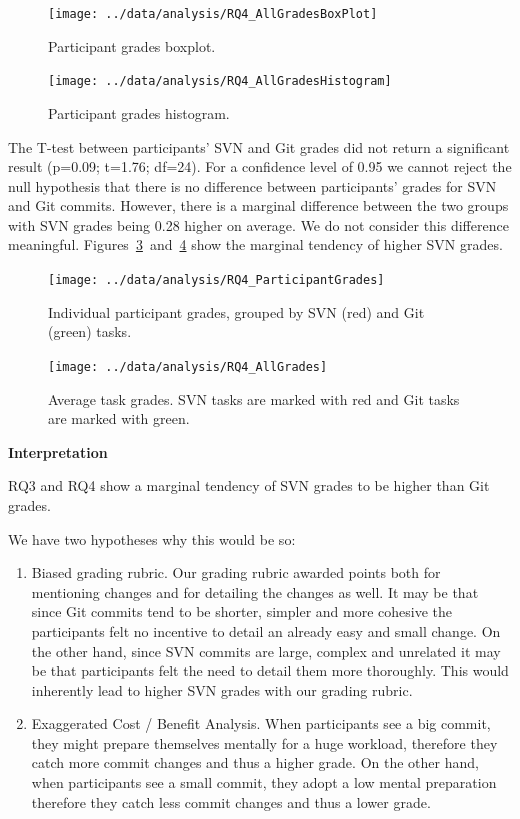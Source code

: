\documentclass[letterpaper]{article}
\begin{document}
\begin{figure}[H]
    \centering
    \texttt{[image: ../data/analysis/RQ4\_AllGradesBoxPlot]}
    \caption{Participant grades boxplot.}
    \label{fig:rq4-allParticipantsBox}
\end{figure}

\begin{figure}[H]
    \centering
    \texttt{[image: ../data/analysis/RQ4\_AllGradesHistogram]}
    \caption{Participant grades histogram.}
    \label{fig:rq4-allParticipantsHist}
\end{figure}

The T-test between participants' SVN and Git grades did not return a significant result (p=0.09; t=1.76; df=24). 
For a confidence level of 0.95 we cannot reject the null hypothesis that there is no difference between participants' grades for SVN and Git commits.
However, there is a marginal difference between the two groups with SVN grades being 0.28 higher on average.
We do not consider this difference meaningful.
Figures~\ref{fig:rq4-participantGrades}~and~\ref{fig:rq4-taskGrades} show the marginal tendency of higher SVN grades.

\begin{figure}[H]
    \centering
    \texttt{[image: ../data/analysis/RQ4\_ParticipantGrades]}
    \caption{Individual participant grades, grouped by SVN (red) and Git (green) tasks.}
    \label{fig:rq4-participantGrades}
\end{figure}

\begin{figure}[H]
    \centering
    \texttt{[image: ../data/analysis/RQ4\_AllGrades]}
    \caption{Average task grades. SVN tasks are marked with red and Git tasks are marked with green.}
    \label{fig:rq4-taskGrades}
\end{figure}

\textbf{Interpretation}

RQ3 and RQ4 show a marginal tendency of SVN grades to be higher than Git grades.

We have two hypotheses why this would be so:
\begin{enumerate}
		\item{Biased grading rubric.}
			Our grading rubric awarded points both for mentioning changes and for detailing the changes as well.
			It may be that since Git commits tend to be shorter, simpler and more cohesive the participants felt no incentive to detail an already easy and small change.
			On the other hand, since SVN commits are large, complex and unrelated it may be that participants felt the need to detail them more thoroughly.
			This would inherently lead to higher SVN grades with our grading rubric.
	\item{Exaggerated Cost / Benefit Analysis.}
			When participants see a big commit, they might prepare themselves mentally for a huge workload, therefore they catch more commit changes and thus a higher grade. 
			On the other hand, when participants see a small commit, they adopt a low mental preparation therefore they catch less commit changes and thus a lower grade.
\end{enumerate}
\end{document}
